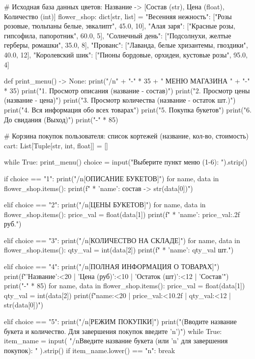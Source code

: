 \documentclass[14pt,a4paper]{extarticle}
\begin{document}
\begin{CodeListing}
    # Исходная база данных цветов: Название -> [Состав (str), Цена (float), Количество (int)]
    flower_shop: dict[str, list] = {
        "Весенняя нежность": ["Розы розовые, тюльпаны белые, эвкалипт", 45.0, 10],
        "Алая заря": ["Красные розы, гипсофила, папоротник", 60.0, 5],
        "Солнечный день": ["Подсолнухи, желтые герберы, ромашки", 35.0, 8],
        "Прованс": ["Лаванда, белые хризантемы, гвоздики", 40.0, 12],
        "Королевский шик": ["Пионы бордовые, орхидеи, кустовые розы", 95.0, 4]
    }

    def print_menu() -> None:
        print("/n" + "-" * 35 + " МЕНЮ МАГАЗИНА " + "-" * 35)
        print("1. Просмотр описания (название - состав)")
        print("2. Просмотр цены (название - цена)")
        print("3. Просмотр количества (название - остаток шт.)")
        print("4. Вся информация обо всех товарах")
        print("5. Покупка букетов")
        print("6. До свидания (Выход)")
        print("-" * 85)

    # Корзина покупок пользователя: список кортежей (название, кол-во, стоимость)
    cart: List[Tuple[str, int, float]] = []

    while True:
        print_menu()
        choice = input("Выберите пункт меню (1-6): ").strip()

        if choice == "1":
            print("/n[ОПИСАНИЕ БУКЕТОВ]")
            for name, data in flower_shop.items():
                print(f" * '{name}': состав -> {str(data[0])}")

        elif choice == "2":
            print("/n[ЦЕНЫ БУКЕТОВ]")
            for name, data in flower_shop.items():
                price_val = float(data[1])
                print(f" * '{name}': {price_val:.2f} руб.")

        elif choice == "3":
            print("/n[КОЛИЧЕСТВО НА СКЛАДЕ]")
            for name, data in flower_shop.items():
                qty_val = int(data[2])
                print(f" * '{name}': {qty_val} шт.")

        elif choice == "4":
            print("/n[ПОЛНАЯ ИНФОРМАЦИЯ О ТОВАРАХ]")
            print(f"{'Название':<20} | {'Цена (руб)':<10} | {'Остаток (шт)':<12} | {'Состав'}")
            print("-" * 85)
            for name, data in flower_shop.items():
                price_val = float(data[1])
                qty_val = int(data[2])
                print(f"{name:<20} | {price_val:<10.2f} | {qty_val:<12} | {str(data[0])}")

        elif choice == "5":
            print("/n[РЕЖИМ ПОКУПКИ]")
            print("(Вводите название букета и количество. Для завершения покупок введите 'n')")
            while True:
                item_name = input(
                    "/nВведите название букета (или 'n' для завершения покупок): "
                ).strip()
                if item_name.lower() == "n":
                    break


\end{CodeListing}
\end{document}
